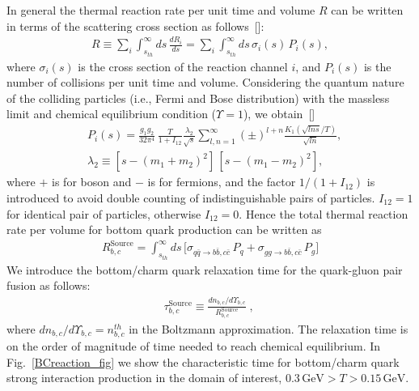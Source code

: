 In general the thermal reaction rate per unit time and volume $R$ can be written in terms of the scattering cross section as follows~[\cite{Letessier:2002ony}]:
\begin{align}
R\equiv\sum_i\int_{s_{th}}^\infty\!ds\,\frac{dR_i}{ds}=\sum_i\int_{s_{th}}^\infty\!ds\,\sigma_i(s)\,P_i(s),
\end{align}
where $\sigma_i(s)$ is the cross section of the reaction channel $i$, and $P_i(s)$ is the number of collisions per unit time and volume. Considering the quantum nature of the colliding particles (i.e., Fermi and Bose distribution) with the massless limit and chemical equilibrium condition ($\Upsilon=1$), we obtain~[\cite{Letessier:2002ony}]
\begin{align}
&P_i(s)=\frac{g_1g_2}{32\pi^4}\,\frac{T}{1+I_{12}}\frac{\lambda_2}{\sqrt{s}}\!\sum_{l,n=1}^{\infty}\!(\pm)^{l+n}\frac{K_1(\sqrt{lns}/T)}{\sqrt{ln}},\\
&\lambda_2\equiv\left[s-\left(m_1+m_2\right)^2\right]\,\left[s-\left(m_1-m_2\right)^2\right],
\end{align}
where $+$ is for boson and $-$ is for fermions, and the factor $1/(1+I_{12})$ is introduced to avoid double counting of indistinguishable pairs of particles. $I_{12}=1$ for identical pair of particles, otherwise $I_{12}=0$. Hence the total thermal reaction rate per volume for bottom quark production can be written as
\begin{align}
\label{Bquark_Source}
R^{\mathrm{Source}}_{b,c}=\int^\infty_{s_{th}}ds\,\bigg[\sigma_{q\bar{q}\rightarrow b\bar{b},c\bar{c}}\,P_q+\sigma_{gg\rightarrow b\bar{b},c\bar{c}}\,P_g\bigg]%
\end{align}
We introduce the bottom/charm quark relaxation time for the quark-gluon pair fusion as follows:
\begin{align}
\label{relaxation_time}
&{\tau_{b,c}^{\mathrm{Source}}}\equiv\frac{dn_{b,c}/d\Upsilon_{b,c}}{R^{\mathrm{Source}}_{b,c}}\;,\quad
\end{align}
where $dn_{b,c}/d\Upsilon_{b,c}=n^{th}_{b,c}$ in the Boltzmann approximation. The relaxation time is on the order of magnitude of time needed to reach chemical equilibrium. In Fig.~\ref{BCreaction_fig} we show the characteristic time for bottom/charm  quark strong interaction production in the domain of interest, $ 0.3\,\mathrm{GeV}>T> 0.15\,\mathrm{GeV}$. 


